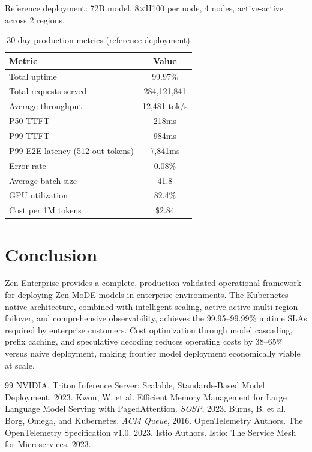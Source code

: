 \documentclass[11pt,a4paper]{article}
\begin{document}
Reference deployment: 72B model, 8$\times$H100 per node, 4 nodes, active-active across 2 regions.

\begin{table}[H]
\centering
\caption{30-day production metrics (reference deployment)}
\label{tab:production}
\begin{tabular}{lc}
\toprule
Metric & Value \\
\midrule
Total uptime & 99.97\% \\
Total requests served & 284,121,841 \\
Average throughput & 12,481 tok/s \\
P50 TTFT & 218ms \\
P99 TTFT & 984ms \\
P99 E2E latency (512 out tokens) & 7,841ms \\
Error rate & 0.08\% \\
Average batch size & 41.8 \\
GPU utilization & 82.4\% \\
Cost per 1M tokens & \$2.84 \\
\bottomrule
\end{tabular}
\end{table}

\section{Conclusion}

Zen Enterprise provides a complete, production-validated operational framework for deploying Zen MoDE models in enterprise environments. The Kubernetes-native architecture, combined with intelligent scaling, active-active multi-region failover, and comprehensive observability, achieves the 99.95--99.99\% uptime SLAs required by enterprise customers. Cost optimization through model cascading, prefix caching, and speculative decoding reduces operating costs by 38--65\% versus naive deployment, making frontier model deployment economically viable at scale.

\begin{thebibliography}{99}
 NVIDIA. Triton Inference Server: Scalable, Standards-Based Model Deployment. 2023.
 Kwon, W. et al. Efficient Memory Management for Large Language Model Serving with PagedAttention. \textit{SOSP}, 2023.
 Burns, B. et al. Borg, Omega, and Kubernetes. \textit{ACM Queue}, 2016.
 OpenTelemetry Authors. The OpenTelemetry Specification v1.0. 2023.
 Istio Authors. Istio: The Service Mesh for Microservices. 2023.
\end{thebibliography}
\end{document}
